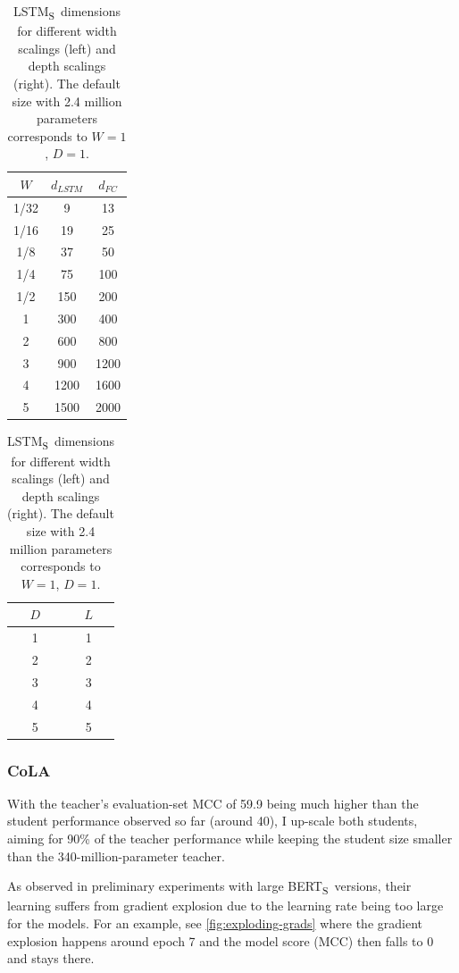 \documentclass[bsc,frontabs,singlespacing,parskip,deptreport]{infthesis}
\def\BERTS{BERT\textsubscript{S}}
\def\LSTMS{LSTM\textsubscript{S}}
\begin{document}
{{{      \begin{table}[h!t]
      \centering
      \begin{tabular}{c|cc}
      \hline
      $W$ & $d_{LSTM}$  & $d_{FC}$\\ 
      \hline
      1/32& 9           & 13 \\
      1/16& 19          & 25 \\
      1/8 & 37          & 50 \\
      1/4 & 75          & 100 \\
      1/2 & 150         & 200 \\
      1   & 300         & 400 \\
      2   & 600         & 800 \\
      3   & 900         & 1200 \\
      4   & 1200        & 1600 \\
      5   & 1500        & 2000 \\
      \hline
      \end{tabular}
      \quad \quad \quad \quad
      \begin{tabular}{c|c}
      \hline
      $D$ & $L$ \\
      \hline
      1   & 1  \\
      2   & 2  \\
      3   & 3  \\
      4   & 4  \\
      5   & 5  \\
      \hline
      \end{tabular}
      \caption{\LSTMS~dimensions for different width scalings (left) and depth scalings (right). The default size with 2.4 million parameters corresponds to $W=1$, $D=1$.}
      \label{tab:sizes-lstm}
      \end{table}

      \subsubsection{CoLA}{
        With the teacher's evaluation-set MCC of 59.9 being much higher than the student performance observed so far (around 40), I up-scale both students, aiming for 90\% of the teacher performance while keeping the student size smaller than the 340-million-parameter teacher.

        As observed in preliminary experiments with large \BERTS~versions, their learning suffers from gradient explosion due to the learning rate being too large for the models. For an example, see \autoref{fig:exploding-grads} where the gradient explosion happens around epoch 7 and the model score (MCC) then falls to 0 and stays there.

}}}}
\end{document}
